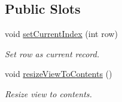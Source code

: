 \subsection*{Public Slots}
\begin{DoxyCompactItemize}
\item 
void \hyperlink{classmdt_sql_table_widget_ae4945234973dcfcb8f2e20830e571fd4}{set\-Current\-Index} (int row)
\begin{DoxyCompactList}\small\item\em Set row as current record. \end{DoxyCompactList}\item 
void \hyperlink{classmdt_sql_table_widget_a2afd70df3855ecf14f86713646ec2763}{resize\-View\-To\-Contents} ()
\begin{DoxyCompactList}\small\item\em Resize view to contents. \end{DoxyCompactList}\end{DoxyCompactItemize}
